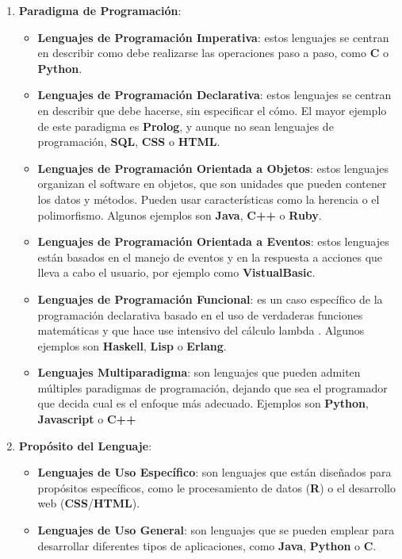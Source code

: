 \begin{enumerate}
		\item \textbf{Paradigma de Programación}:
		\begin{itemize}
			\item \textbf{Lenguajes de Programación Imperativa}: estos lenguajes se centran en describir como debe realizarse las operaciones paso a paso, como \textbf{C} o \textbf{Python}.
			\item \textbf{Lenguajes de Programación Declarativa}: estos lenguajes se centran en describir que debe hacerse, sin especificar el cómo. El mayor ejemplo de este paradigma es \textbf{Prolog}, y aunque no sean lenguajes de programación, \textbf{SQL}, \textbf{CSS} o \textbf{HTML}.
			\item \textbf{Lenguajes de Programación Orientada a Objetos}: estos lenguajes organizan el software en objetos, que son unidades que pueden contener los datos y métodos. Pueden usar características como la herencia o el polimorfismo. Algunos ejemplos son \textbf{Java}, \textbf{C++} o \textbf{Ruby}.
			\item \textbf{Lenguajes de Programación Orientada a Eventos}: estos lenguajes están basados en el manejo de eventos y en la respuesta a acciones que lleva a cabo el usuario, por ejemplo como \textbf{VistualBasic}.
			\item \textbf{Lenguajes de Programación Funcional}: es un caso específico de la programación declarativa basado en el uso de verdaderas funciones matemáticas y que hace use intensivo del cálculo lambda \cite{wiki01}. Algunos ejemplos son \textbf{Haskell}, \textbf{Lisp} o \textbf{Erlang}.
			\item \textbf{Lenguajes Multiparadigma}: son lenguajes que pueden admiten múltiples paradigmas de programación, dejando que sea el programador que decida cual es el enfoque más adecuado. Ejemplos son \textbf{Python}, \textbf{Javascript} o \textbf{C++}
		\end{itemize} 
		
		\item \textbf{Propósito del Lenguaje}: 
		\begin{itemize}
			\item \textbf{Lenguajes de Uso Específico}: son lenguajes que están diseñados para propósitos específicos, como le procesamiento de datos (\textbf{R}) o el desarrollo web (\textbf{CSS}/\textbf{HTML}).
			\item \textbf{Lenguajes de Uso General}: son lenguajes que se pueden emplear para desarrollar diferentes tipos de aplicaciones, como \textbf{Java}, \textbf{Python} o \textbf{C}. 
		\end{itemize}


\end{enumerate}
